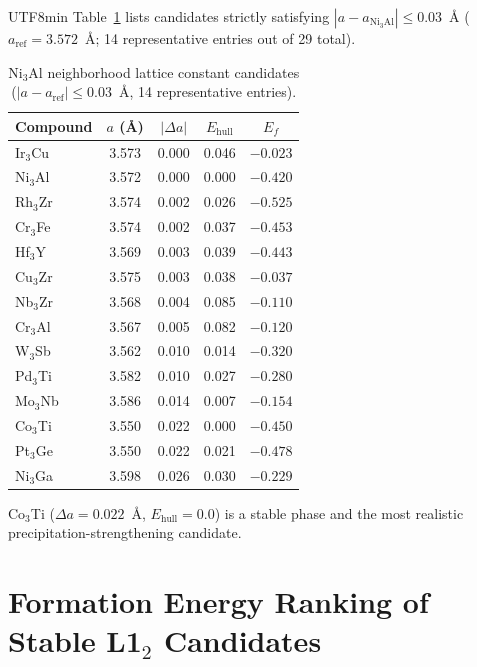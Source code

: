 \documentclass[sn-mathphys,Numbered]{sn-jnl}
\begin{document}
\begin{CJK}{UTF8}{min}
Table~\ref{tab:sup_lattice_match} lists candidates strictly
satisfying $|a - a_{\text{Ni}_3\text{Al}}| \leq 0.03$~\AA
($a_{\text{ref}} = 3.572$~\AA; 14 representative entries out of
29 total).

\begin{table}[htbp]
  \centering
  \caption{Ni$_3$Al neighborhood lattice constant candidates ($|a - a_{\text{ref}}| \leq 0.03$~\AA, 14 representative entries).}
  \label{tab:sup_lattice_match}
  \small
  \begin{tabular}{lcccc}
    \toprule
    Compound & $a$ (\AA) & $|\Delta a|$ & $E_\text{hull}$ & $E_f$ \\
    \midrule
    Ir$_3$Cu & 3.573 & 0.000 & 0.046 & $-0.023$ \\
    Ni$_3$Al & 3.572 & 0.000 & 0.000 & $-0.420$ \\
    Rh$_3$Zr & 3.574 & 0.002 & 0.026 & $-0.525$ \\
    Cr$_3$Fe & 3.574 & 0.002 & 0.037 & $-0.453$ \\
    Hf$_3$Y & 3.569 & 0.003 & 0.039 & $-0.443$ \\
    Cu$_3$Zr & 3.575 & 0.003 & 0.038 & $-0.037$ \\
    Nb$_3$Zr & 3.568 & 0.004 & 0.085 & $-0.110$ \\
    Cr$_3$Al & 3.567 & 0.005 & 0.082 & $-0.120$ \\
    W$_3$Sb & 3.562 & 0.010 & 0.014 & $-0.320$ \\
    Pd$_3$Ti & 3.582 & 0.010 & 0.027 & $-0.280$ \\
    Mo$_3$Nb & 3.586 & 0.014 & 0.007 & $-0.154$ \\
    Co$_3$Ti & 3.550 & 0.022 & 0.000 & $-0.450$ \\
    Pt$_3$Ge & 3.550 & 0.022 & 0.021 & $-0.478$ \\
    Ni$_3$Ga & 3.598 & 0.026 & 0.030 & $-0.229$ \\
    \bottomrule
  \end{tabular}
\end{table}

Co$_3$Ti ($\Delta a = 0.022$~\AA, $E_\text{hull} = 0.0$) is a
stable phase and the most realistic precipitation-strengthening
candidate.

\section{Formation Energy Ranking of Stable L1$_2$ Candidates}
\label{sec:sup_stable_l12}


\end{CJK}
\end{document}
